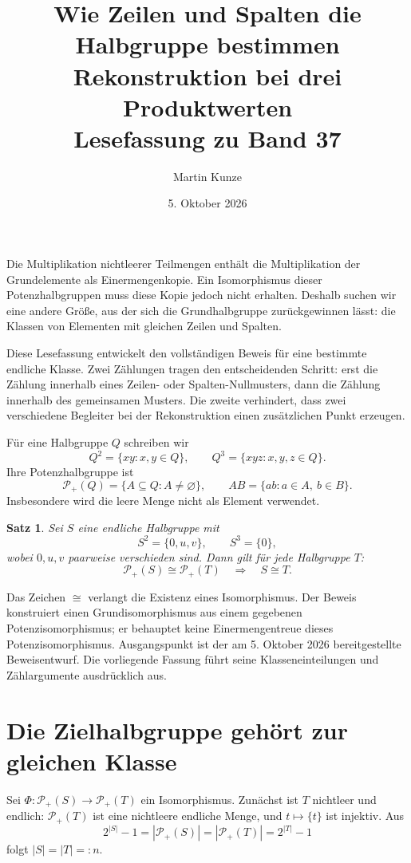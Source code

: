 \documentclass[a4paper,11pt]{article}
\title{Wie Zeilen und Spalten die Halbgruppe bestimmen\\[.5em]
\large Rekonstruktion bei drei Produktwerten\\Lesefassung zu Band 37}
\author{Martin Kunze}
\date{5. Oktober 2026}
\newcommand{\Pp}[1]{\mathcal P_+(#1)}
\newtheorem{satz}{Satz}
\theoremstyle{remark}
\begin{document}
\maketitle

Die Multiplikation nichtleerer Teilmengen enthält die Multiplikation der
Grundelemente als Einermengenkopie. Ein Isomorphismus dieser
Potenzhalbgruppen muss diese Kopie jedoch nicht erhalten. Deshalb suchen
wir eine andere Größe, aus der sich die Grundhalbgruppe zurückgewinnen
lässt: die Klassen von Elementen mit gleichen Zeilen und Spalten.

Diese Lesefassung entwickelt den vollständigen Beweis für eine bestimmte
endliche Klasse. Zwei Zählungen tragen den entscheidenden Schritt: erst
die Zählung innerhalb eines Zeilen- oder Spalten-Nullmusters, dann die
Zählung innerhalb des gemeinsamen Musters. Die zweite verhindert, dass
zwei verschiedene Begleiter bei der Rekonstruktion einen zusätzlichen
Punkt erzeugen.

Für eine Halbgruppe \(Q\) schreiben wir
\[
 Q^2=\{xy:x,y\in Q\},\qquad Q^3=\{xyz:x,y,z\in Q\}.
\]
Ihre Potenzhalbgruppe ist
\[
 \Pp Q=\{A\subseteq Q:A\ne\varnothing\},\qquad
 AB=\{ab:a\in A,\ b\in B\}.
\]
Insbesondere wird die leere Menge nicht als Element verwendet.

\begin{satz}\label{tp:main}
Sei \(S\) eine endliche Halbgruppe mit
\[
 S^2=\{0,u,v\},\qquad S^3=\{0\},
\]
wobei \(0,u,v\) paarweise verschieden sind. Dann gilt für jede
Halbgruppe \(T\):
\[
 \Pp S\cong\Pp T\quad\Longrightarrow\quad S\cong T.
\]
\end{satz}

Das Zeichen \(\cong\) verlangt die Existenz eines Isomorphismus.
Der Beweis konstruiert einen Grundisomorphismus aus einem gegebenen
Potenzisomorphismus; er behauptet keine Einermengentreue dieses
Potenzisomorphismus. Ausgangspunkt ist der am 5. Oktober 2026
bereitgestellte Beweisentwurf. Die vorliegende Fassung führt seine
Klasseneinteilungen und Zählargumente ausdrücklich aus.

\section{Die Zielhalbgruppe gehört zur gleichen Klasse}

Sei \(\Phi:\Pp S\to\Pp T\) ein Isomorphismus. Zunächst ist
\(T\) nichtleer und endlich: \(\Pp T\) ist eine nichtleere
endliche Menge, und \(t\mapsto\{t\}\) ist injektiv. Aus
\[
 2^{|S|}-1=|\Pp S|=|\Pp T|=2^{|T|}-1
\]
folgt \(|S|=|T|=:n\).
\end{document}
